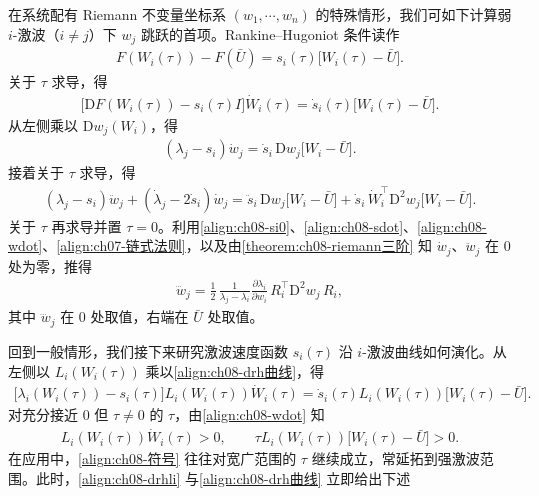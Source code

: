 \documentclass[../../main.tex]{subfiles}
\begin{document}
在系统配有 Riemann 不变量坐标系 $(w_1,\cdots,w_n)$ 的特殊情形，我们可如下计算弱 $i$-激波（$i\neq j$）下 $w_j$ 跳跃的首项。Rankine--Hugoniot 条件读作
\begin{align}
F(W_i(\tau))-F(\bar U)=s_i(\tau)\big[W_i(\tau)-\bar U\big].
\label{align:ch08-rh曲线}
\end{align}
关于 $\tau$ 求导，得
\begin{align}
\big[\mathrm{D}F(W_i(\tau))-s_i(\tau)I\big]\dot W_i(\tau)=\dot s_i(\tau)\big[W_i(\tau)-\bar U\big].
\label{align:ch08-drh曲线}
\end{align}
从左侧乘以 $\mathrm{D}w_j(W_i)$，得
\begin{align}
(\lambda_j-s_i)\dot w_j=\dot s_i\,\mathrm{D}w_j\big[W_i-\bar U\big].
\label{align:ch08-drh2}
\end{align}
接着关于 $\tau$ 求导，得
\begin{align}
(\lambda_j-s_i)\ddot w_j+(\dot\lambda_j-2\dot s_i)\dot w_j
=\ddot s_i\,\mathrm{D}w_j\big[W_i-\bar U\big]
+\dot s_i\,\dot W_i^{\top}\mathrm{D}^2 w_j\big[W_i-\bar U\big].
\label{align:ch08-drh3}
\end{align}
关于 $\tau$ 再求导并置 $\tau=0$。利用\eqref{align:ch08-si0}、\eqref{align:ch08-sdot}、\eqref{align:ch08-wdot}、\eqref{align:ch07-链式法则}，以及由\cref{theorem:ch08-riemann三阶} 知 $\dot w_j$、$\ddot w_j$ 在 $0$ 处为零，推得
\begin{align}
\dddot w_j=\frac12\,\frac{1}{\lambda_j-\lambda_i}\frac{\partial\lambda_i}{\partial w_i}\,R_i^{\top}\mathrm{D}^2 w_j\,R_i,
\label{align:ch08-riemann三阶展开}
\end{align}
其中 $\dddot w_j$ 在 $0$ 处取值，右端在 $\bar U$ 处取值。

回到一般情形，我们接下来研究激波速度函数 $s_i(\tau)$ 沿 $i$-激波曲线如何演化。从左侧以 $L_i(W_i(\tau))$ 乘以\eqref{align:ch08-drh曲线}，得
\begin{align}
\big[\lambda_i(W_i(\tau))-s_i(\tau)\big]L_i(W_i(\tau))\dot W_i(\tau)
=\dot s_i(\tau)L_i(W_i(\tau))\big[W_i(\tau)-\bar U\big].
\label{align:ch08-drhli}
\end{align}
对充分接近 $0$ 但 $\tau\neq0$ 的 $\tau$，由\eqref{align:ch08-wdot} 知
\begin{align}
L_i(W_i(\tau))\dot W_i(\tau)>0,\qquad \tau L_i(W_i(\tau))\big[W_i(\tau)-\bar U\big]>0.
\label{align:ch08-符号}
\end{align}
在应用中，\eqref{align:ch08-符号} 往往对宽广范围的 $\tau$ 继续成立，常延拓到强激波范围。此时，\eqref{align:ch08-drhli} 与\eqref{align:ch08-drh曲线} 立即给出下述
\end{document}
